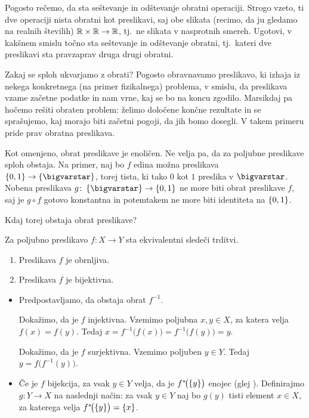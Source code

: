 		\begin{vaja}
			Pogosto rečemo, da sta seštevanje in odštevanje obratni operaciji. Strogo vzeto, ti dve operaciji nista obratni kot preslikavi, saj obe slikata (recimo, da ju gledamo na realnih številih) $\mathbb{R} \times \mathbb{R} \to \mathbb{R}$, tj.~ne slikata v nasprotnih smereh. Ugotovi, v kakšnem smislu točno sta seštevanje in odštevanje obratni, tj.~kateri dve preslikavi sta pravzaprav druga drugi obratni.
		\end{vaja}
		
		Zakaj se sploh ukvarjamo z obrati? Pogosto obravnavamo preslikavo, ki izhaja iz nekega konkretnega (na primer fizikalnega) problema, v smislu, da preslikava vzame začetne podatke in nam vrne, kaj se bo na koncu zgodilo. Marsikdaj pa hočemo rešiti obraten problem: želimo določene končne rezultate in se sprašujemo, kaj morajo biti začetni pogoji, da jih bomo dosegli. V takem primeru pride prav obratna preslikava.
		
		Kot omenjeno, obrat preslikave je enoličen. Ne velja pa, da za poljubne preslikave sploh obstaja. Na primer, naj bo $f$ edina možna preslikava $\set{0, 1} \to \set{\unit}$, torej tista, ki tako $0$ kot $1$ preslika v $\unit$. Nobena preslikava $g\colon \set{\unit} \to \set{0, 1}$ ne more biti obrat preslikave $f$, saj je $g \circ f$ gotovo konstantna in potemtakem ne more biti identiteta na $\set{0, 1}$.
		
		Kdaj torej obstaja obrat preslikave?
		
		\begin{trditev}
			Za poljubno preslikavo $f\colon X \to Y$ sta ekvivalentni sledeči trditvi.
			\begin{enumerate}
				\item
					Preslikava $f$ je obrnljiva.
				\item
					Preslikava $f$ je bijektivna.
			\end{enumerate}
		\end{trditev}
		
		\begin{dokaz}
			\begin{itemize}
				\item{}
					Predpostavljamo, da obstaja obrat $f^{-1}$.
					
					Dokažimo, da je $f$ injektivna. Vzemimo poljubna $x, y \in X$, za katera velja $f(x) = f(y)$. Tedaj $x = f^{-1}\big(f(x)\big) = f^{-1}\big(f(y)\big) = y$.
					
					Dokažimo, da je $f$ surjektivna. Vzemimo poljuben $y \in Y$. Tedaj $y = f\big(f^{-1}(y)\big)$.
				\item{}
					Če je $f$ bijekcija, za vsak $y \in Y$ velja, da je $\pim[1]{f}{\set{y}}$ enojec (glej ). Definirajmo $g\colon Y \to X$ na naslednji način: za vsak $y \in Y$ naj bo $g(y)$ tisti element $x \in X$, za katerega velja $\pim[1]{f}{\set{y}} = \set{x}$. 
			\end{itemize}
		\end{dokaz}
		
